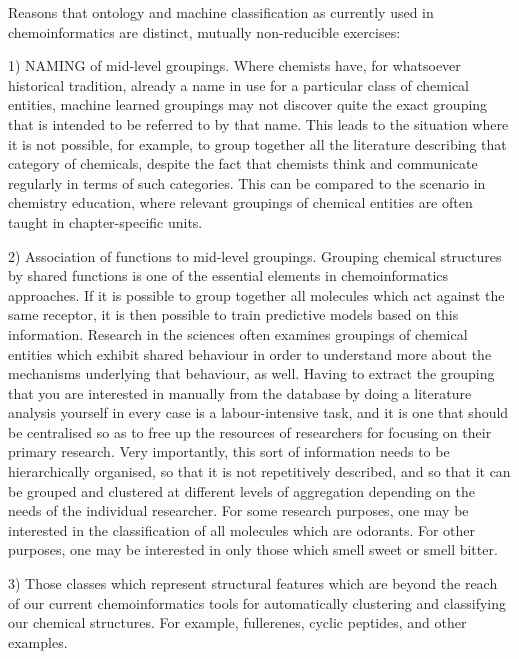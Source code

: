 \documentclass[10pt]{bmc_article}
\newenvironment{bmcformat}{\baselineskip20pt\sloppy\setboolean{publ}{false}}{\baselineskip20pt\sloppy}
\begin{document}
\begin{bmcformat}
Reasons that ontology and machine classification as currently used in chemoinformatics are distinct, mutually non-reducible exercises:  

1) NAMING of mid-level groupings. Where chemists have, for whatsoever historical tradition, already a name in use for a particular class of chemical entities, machine learned groupings may not discover quite the exact grouping that is intended to be referred to by that name. This leads to the situation where it is not possible, for example, to group together all the literature describing that category of chemicals, despite the fact that chemists think and communicate regularly in terms of such categories.  This can be compared to the scenario in chemistry education, where relevant groupings of chemical entities are often taught in chapter-specific units. %

2) Association of functions to mid-level groupings.  Grouping chemical structures by shared functions is one of the essential elements in chemoinformatics approaches.  If it is possible to group together all molecules which act against the same receptor, it is then possible to train predictive models based on this information.   %
Research in the sciences often examines groupings of chemical entities which exhibit shared behaviour in order to understand more about the mechanisms underlying that behaviour, as well. %
Having to extract the grouping that you are interested in manually from the database by doing a literature analysis yourself in every case is a labour-intensive task, and it is one that should be centralised so as to free up the resources of researchers for focusing on their primary research. 
Very importantly, this sort of information needs to be hierarchically organised, so that it is not repetitively described, and so that it can be grouped and clustered at different levels of aggregation depending on the needs of the individual researcher.  For some research purposes, one may be interested in the classification of all molecules which are odorants. For other purposes, one may be interested in only those which smell sweet or smell bitter. 

3) Those classes which represent structural features which are beyond the reach of our current chemoinformatics tools for automatically clustering and classifying our chemical structures. For example, fullerenes, cyclic peptides, and other examples. 


\end{bmcformat}
\end{document}
